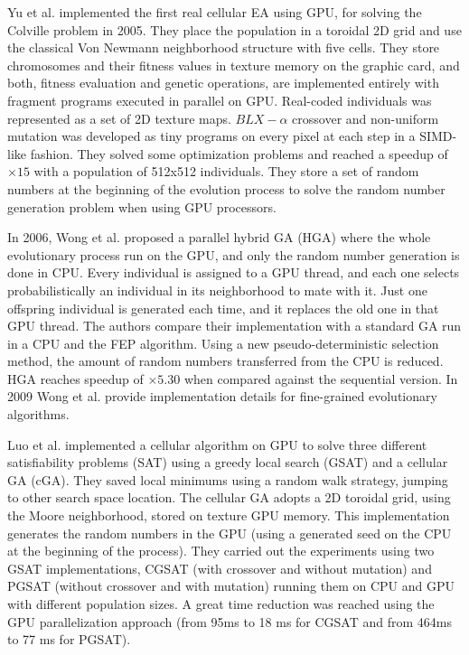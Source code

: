 \documentclass[review]{elsarticle}
\begin{document}
Yu et al. \cite{yu-parallel-2005} implemented the first real cellular EA using GPU, for solving the Colville problem \cite{Ng:2005:DFF:1064290.1064296} in 2005. They place the population in a toroidal 2D grid and use the classical Von Newmann neighborhood structure with five cells. They store chromosomes and their fitness values in texture memory on the graphic card, and both, fitness evaluation and genetic operations, are implemented entirely with fragment programs executed in parallel on GPU. Real-coded individuals was represented as a set of 2D texture maps. $BLX-\alpha$ crossover and non-uniform mutation was developed as tiny programs on every pixel at each step in a SIMD-like fashion. They solved some optimization problems and reached a speedup of $\times15$ with a population of 512x512 individuals. They store a set of random numbers at the beginning of the evolution process to solve the random number generation problem when using GPU processors. 

In 2006, Wong et al. \cite{man-leung-wong-parallel-2006} proposed a parallel hybrid GA (HGA) where the whole evolutionary process run on the GPU, and only the random number generation is done in CPU. Every individual is assigned to a GPU thread, and each one selects probabilistically an individual in its neighborhood to mate with it. Just one offspring individual is generated each time, and it replaces the old one in that GPU thread. The authors compare their implementation with a standard GA run in a CPU and the FEP \cite{man-leung-wong-parallel-2005} algorithm. Using a new pseudo-deterministic selection method, the amount of random numbers transferred from the CPU is reduced. HGA reaches speedup of $\times5.30$ when compared against the sequential version. In 2009 Wong et al. \cite{wong-implementation-2009} provide implementation details for fine-grained evolutionary algorithms.  

Luo et al. \cite{zhongwen-luo-cellular-2006} implemented a cellular algorithm on GPU to solve three different satisfiability problems (SAT) 
using a greedy local search (GSAT) \cite{Selman93domain-independentextensions} and a cellular GA (cGA). 
They saved local minimums using a random walk strategy, jumping to other search space location. 
The cellular GA adopts a 2D toroidal grid, using the Moore neighborhood, stored on texture GPU memory. This implementation generates the random numbers in the GPU (using a generated seed on the CPU at the beginning of the process). They carried out the experiments using two GSAT implementations, CGSAT (with crossover and without mutation) and PGSAT (without crossover and with mutation) running them on CPU and GPU with different population sizes. A great time reduction was reached using the GPU parallelization approach (from 95ms to 18 ms for CGSAT and from 464ms to 77 ms for PGSAT).
\end{document}
